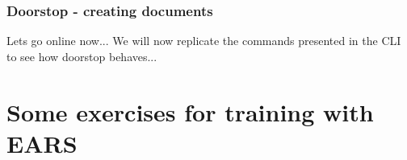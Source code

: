 \documentclass[aspectratio=169]{beamer}
\begin{document}
%
%
%
%


\begin{frame}
  \frametitle{Doorstop - creating documents}
  \begin{block}{Lets go online now...}
  We will now replicate the commands presented in the CLI to see how doorstop behaves...
  \end{block}
\end{frame}

\section*{Some exercises for training with EARS}
\end{document}
